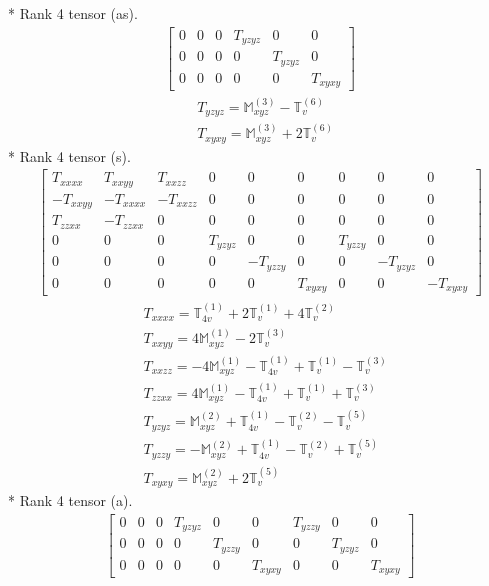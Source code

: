\documentclass[fleqn,8pt,landscape]{jsarticle}
\begin{document}
* Rank 4 tensor (as).
\begin{align*}
\begin{bmatrix} 0 & 0 & 0 & T_{yzyz} & 0 & 0 \\ 0 & 0 & 0 & 0 & T_{yzyz} & 0 \\ 0 & 0 & 0 & 0 & 0 & T_{xyxy} \end{bmatrix}
\end{align*}
\begin{align*}
& T_{yzyz} = \mathbb{M}_{xyz}^{(3)} - \mathbb{T}_{v}^{(6)} \\
& T_{xyxy} = \mathbb{M}_{xyz}^{(3)} + 2 \mathbb{T}_{v}^{(6)}
\end{align*}
* Rank 4 tensor (s).
\begin{align*}
\begin{bmatrix} T_{xxxx} & T_{xxyy} & T_{xxzz} & 0 & 0 & 0 & 0 & 0 & 0 \\ - T_{xxyy} & - T_{xxxx} & - T_{xxzz} & 0 & 0 & 0 & 0 & 0 & 0 \\ T_{zzxx} & - T_{zzxx} & 0 & 0 & 0 & 0 & 0 & 0 & 0 \\ 0 & 0 & 0 & T_{yzyz} & 0 & 0 & T_{yzzy} & 0 & 0 \\ 0 & 0 & 0 & 0 & - T_{yzzy} & 0 & 0 & - T_{yzyz} & 0 \\ 0 & 0 & 0 & 0 & 0 & T_{xyxy} & 0 & 0 & - T_{xyxy} \end{bmatrix}
\end{align*}
\begin{align*}
& T_{xxxx} = \mathbb{T}_{4v}^{(1)} + 2 \mathbb{T}_{v}^{(1)} + 4 \mathbb{T}_{v}^{(2)} \\
& T_{xxyy} = 4 \mathbb{M}_{xyz}^{(1)} - 2 \mathbb{T}_{v}^{(3)} \\
& T_{xxzz} = - 4 \mathbb{M}_{xyz}^{(1)} - \mathbb{T}_{4v}^{(1)} + \mathbb{T}_{v}^{(1)} - \mathbb{T}_{v}^{(3)} \\
& T_{zzxx} = 4 \mathbb{M}_{xyz}^{(1)} - \mathbb{T}_{4v}^{(1)} + \mathbb{T}_{v}^{(1)} + \mathbb{T}_{v}^{(3)} \\
& T_{yzyz} = \mathbb{M}_{xyz}^{(2)} + \mathbb{T}_{4v}^{(1)} - \mathbb{T}_{v}^{(2)} - \mathbb{T}_{v}^{(5)} \\
& T_{yzzy} = - \mathbb{M}_{xyz}^{(2)} + \mathbb{T}_{4v}^{(1)} - \mathbb{T}_{v}^{(2)} + \mathbb{T}_{v}^{(5)} \\
& T_{xyxy} = \mathbb{M}_{xyz}^{(2)} + 2 \mathbb{T}_{v}^{(5)}
\end{align*}
* Rank 4 tensor (a).
\begin{align*}
\begin{bmatrix} 0 & 0 & 0 & T_{yzyz} & 0 & 0 & T_{yzzy} & 0 & 0 \\ 0 & 0 & 0 & 0 & T_{yzzy} & 0 & 0 & T_{yzyz} & 0 \\ 0 & 0 & 0 & 0 & 0 & T_{xyxy} & 0 & 0 & T_{xyxy} \end{bmatrix}
\end{align*}
\end{document}

